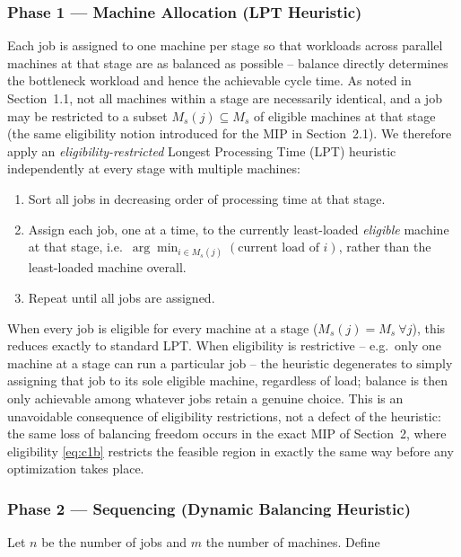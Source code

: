 \documentclass[11pt,a4paper]{article}
\begin{document}
\subsubsection*{Phase 1 --- Machine Allocation (LPT Heuristic)}

Each job is assigned to one machine per stage so that workloads across
parallel machines at that stage are as balanced as possible -- balance
directly determines the bottleneck workload and hence the achievable cycle
time. As noted in Section~1.1, not all machines within a stage are
necessarily identical, and a job may be restricted to a subset
$M_s(j) \subseteq M_s$ of eligible machines at that stage (the same
eligibility notion introduced for the MIP in Section~2.1). We therefore
apply an \emph{eligibility-restricted} Longest Processing Time (LPT)
heuristic \citep{pinedo2016scheduling} independently at every stage with
multiple machines:

\begin{enumerate}
  \item Sort all jobs in decreasing order of processing time at that stage.
  \item Assign each job, one at a time, to the currently least-loaded
    \emph{eligible} machine at that stage, i.e.\ $\arg\min_{i \in M_s(j)}
    (\text{current load of } i)$, rather than the least-loaded machine
    overall.
  \item Repeat until all jobs are assigned.
\end{enumerate}

When every job is eligible for every machine at a stage ($M_s(j)=M_s\
\forall j$), this reduces exactly to standard LPT. When eligibility is
restrictive -- e.g.\ only one machine at a stage can run a particular job
-- the heuristic degenerates to simply assigning that job to its sole
eligible machine, regardless of load; balance is then only achievable
among whatever jobs retain a genuine choice. This is an unavoidable
consequence of eligibility restrictions, not a defect of the heuristic:
the same loss of balancing freedom occurs in the exact MIP of Section~2,
where eligibility \eqref{eq:c1b} restricts the feasible region in
exactly the same way before any optimization takes place.

\subsubsection*{Phase 2 --- Sequencing (Dynamic Balancing Heuristic)}

Let $n$ be the number of jobs and $m$ the number of machines. Define
\end{document}
